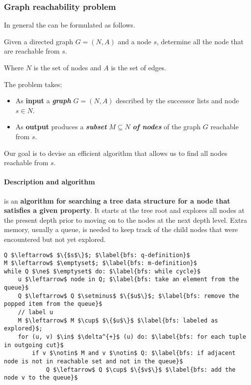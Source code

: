 \subsubsection{Graph reachability problem}

In general the  can be formulated as follows.

\begin{definitionbox}
    Given a directed graph $G = \left(N,A\right)$ and a node $s$, determine all the node that are reachable from $s$.
\end{definitionbox}

\noindent
Where $N$ is the set of nodes and $A$ is the set of edges.

\highspace
The problem takes:
\begin{itemize}
    \item As \textbf{input} a \emph{\textbf{graph}} $G = \left(N,A\right)$ described by the successor lists and node $s \in N$.
    
    \item As \textbf{output} produces a \emph{\textbf{subset}} $M \subseteq N$ \emph{\textbf{of nodes}} of the graph $G$ reachable from $s$.
\end{itemize}
Our goal is to devise an efficient algorithm that allows us to find all nodes reachable from $s$.

\newpage

\paragraph{Description and algorithm}

\begin{definitionbox}
     is an \textbf{algorithm for searching a tree data structure for a node that satisfies a given property}. It starts at the tree root and explores all nodes at the present depth prior to moving on to the nodes at the next depth level. Extra memory, usually a queue, is needed to keep track of the child nodes that were encountered but not yet explored.
\end{definitionbox}

\begin{lstlisting}[language=pseudo-code, caption={Graph reachability problem: Breadth-First Search $O\left(\left|N\right|+\left|A\right|\right)$}]
Q $\leftarrow$ $\{$s$\}$; $\label{bfs: q-definition}$
M $\leftarrow$ $\emptyset$; $\label{bfs: m-definition}$
while Q $\ne$ $\emptyset$ do: $\label{bfs: while cycle}$
    u $\leftarrow$ node in Q; $\label{bfs: take an element from the queue}$
    Q $\leftarrow$ Q $\setminus$ $\{$u$\}$; $\label{bfs: remove the popped item from the queue}$
    // label u
    M $\leftarrow$ M $\cup$ $\{$u$\}$ $\label{bfs: labeled as explored}$;
    for (u, v) $\in$ $\delta^{+}$ (u) do: $\label{bfs: for each tuple in outgoing cut}$
        if v $\notin$ M and v $\notin$ Q: $\label{bfs: if adjacent node is not in reachable set and not in the queue}$
            Q $\leftarrow$ Q $\cup$ $\{$v$\}$ $\label{bfs: add the node v to the queue}$
\end{lstlisting}

